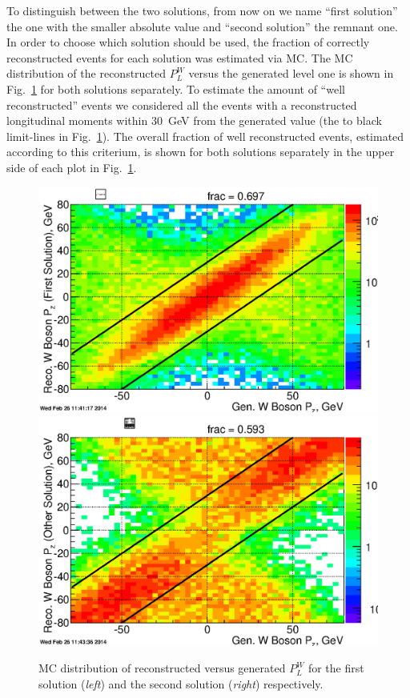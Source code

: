 \documentclass[12pt]{article}
\begin{document}
To distinguish between the two solutions, from now on we name ``first solution'' the one with the smaller absolute value and ``second solution'' the remnant one. In order to choose which solution should be used, the fraction of correctly reconstructed events for each solution was estimated via MC. The MC distribution of the reconstructed $P^{W}_{L}$ versus the generated level one is shown in Fig.~\ref{fig:plot_hRecoVsWBosonPz}  for both solutions separately. To estimate the amount of ``well reconstructed'' events we considered all the events with a reconstructed longitudinal moments within 30~GeV from the generated value (the to black limit-lines in  Fig.~\ref{fig:plot_hRecoVsWBosonPz}). The overall fraction of well reconstructed events, estimated according to this criterium, is shown for both solutions separately in the upper side of each plot in Fig.~\ref{fig:plot_hRecoVsWBosonPz}.
\begin{figure}[htbp]
\begin{center}
\includegraphics[scale=0.43]{images/P_long_study/hRecoVsWBosonPz_FirstSol}
\includegraphics[scale=0.43]{images/P_long_study/hRecoVsWBosonPz_OtherSol}
\end{center}
\caption{MC distribution of reconstructed versus generated $P^{W}_{L}$ for the first solution ({\it left}) and the second solution ({\it right}) respectively.}
\label{fig:plot_hRecoVsWBosonPz} 
\end{figure} 
\end{document}
